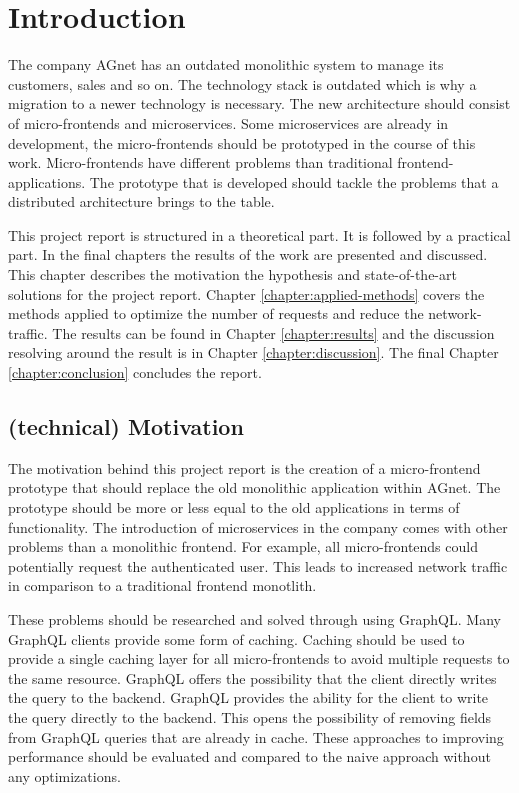 \chapter{Introduction}\label{chapter:introduction}
 
The company AGnet has an outdated monolithic system to manage its customers, sales and so on. The technology stack is outdated which is why a migration to a newer technology is necessary. The new architecture should consist of micro-frontends and microservices. Some microservices are already in development, the micro-frontends should be prototyped in the course of this work. Micro-frontends have different problems than traditional frontend-applications. The prototype that is developed should tackle the problems that a distributed architecture brings to the table.
 
This project report is structured in a theoretical part. It is followed by a practical part. In the final chapters the results of the work are presented and discussed. This chapter describes the motivation the hypothesis and state-of-the-art solutions for the project report. Chapter \ref{chapter:applied-methods} covers the methods applied to optimize the number of requests and reduce the network-traffic. The results can be found in Chapter \ref{chapter:results} and the discussion resolving around the result is in Chapter \ref{chapter:discussion}. The final Chapter \ref{chapter:conclusion} concludes the report.

\section{(technical) Motivation}

The motivation behind this project report is the creation of a micro-frontend prototype that should replace the old monolithic application within AGnet. The prototype should be more or less equal to the old applications in terms of functionality. The introduction of microservices in the company comes with other problems than a monolithic frontend. For example, all micro-frontends could potentially request the authenticated user. This leads to increased network traffic in comparison to a traditional frontend monotlith.

These problems should be researched and solved through using GraphQL. Many GraphQL clients provide some form of caching. Caching should be used to provide a single caching layer for all micro-frontends to avoid multiple requests to the same resource. GraphQL offers the possibility that the client directly writes the query to the backend. GraphQL provides the ability for the client to write the query directly to the backend. This opens the possibility of removing fields from GraphQL queries that are already in cache. These approaches to improving performance should be evaluated and compared to the naive approach without any optimizations.

